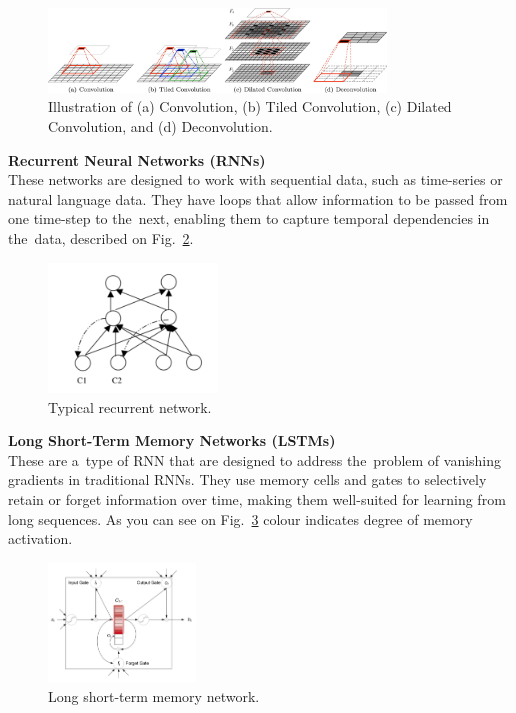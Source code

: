     \begin{center}
        \begin{figure}[!ht]
            \centering
            \includegraphics[width=0.8\textwidth]{figures/cn}
            \caption{Illustration of (a) Convolution, (b) Tiled Convolution, (c) Dilated Convolution, and (d)
                Deconvolution. \cite{GU2018354}}
            \label{fig:cn}
        \end{figure}
    \end{center}
    \textbf{Recurrent Neural Networks (RNNs)}\\
    These networks are designed to work with sequential data, such as time-series or natural language data. They have loops that allow information to be passed from one time-step to the~next, enabling them to capture temporal dependencies in the~data, described on Fig.~\ref{fig:rn}.
        \begin{center}
        \begin{figure}[!ht]
            \centering
            \includegraphics[width=0.4\textwidth]{figures/rn}
            \caption{Typical recurrent network. \cite{medsker2001recurrent}}
            \label{fig:rn}
        \end{figure}
    \end{center}
    \textbf{Long Short-Term Memory Networks (LSTMs)}\\
    These are a~type of RNN that are designed to address the~problem of vanishing gradients in traditional RNNs. They use memory cells and gates to selectively retain or forget information over time, making them well-suited for learning from long sequences. As you can see on Fig.~\ref{fig:ltmn} colour indicates degree of memory activation.
    \begin{center}
        \begin{figure}[!ht]
            \centering
            \includegraphics[width=0.35\textwidth]{figures/ltmn}
            \caption{Long short-term memory network. \cite{cheng2016long}}
            \label{fig:ltmn}
        \end{figure}
    \end{center}
